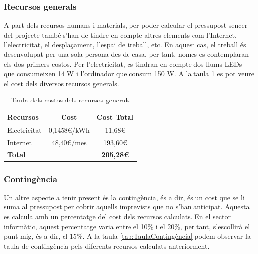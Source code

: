 \documentclass[a4paper]{article}
\begin{document}
\subsubsection{Recursos generals}
A part dels recursos humans i materials, per poder calcular el pressupost sencer del projecte també s'han de tindre en compte altres elements com l'Internet, l'electricitat, el desplaçament, l'espai de treball, etc. En aquest cas, el treball és desenvolupat per una sola persona des de casa, per tant, només es contemplaran els dos primers costos. Per l'electricitat, es tindran en compte dos llums LEDs que consumeixen 14 W i l'ordinador que consum 150 W. A la taula \ref{tab:TaulaCostosGenerals} es pot veure el cost dels diversos recursos generals.

\begin{table}[H]
    \begin{center}
        \begin{tabular}{|l|c|c|}
            \hline
            \rowcolor[HTML]{9B9B9B} 
            {\color[HTML]{000000} \textbf{Recursos}} & {\color[HTML]{000000} \textbf{Cost}} & {\color[HTML]{000000} \textbf{Cost Total}} \\ \hline
            Electricitat                             & 0,1458€/kWh                          & 11,68€                                     \\ \hline
            Internet                                 & 48,40€/mes                           & 193,60€                                    \\ \hline
            \rowcolor[HTML]{C0C0C0} 
            {\color[HTML]{000000} \textbf{Total}}    & {\color[HTML]{000000} \textbf{}}     & {\color[HTML]{000000} \textbf{205,28€}}    \\ \hline
        \end{tabular}
        \caption{Taula dels costos dels recursos generals}
        \label{tab:TaulaCostosGenerals}
    \end{center}
\end{table}

\subsubsection{Contingència}
Un altre aspecte a tenir present és la contingència, és a dir, és un cost que se li suma al pressupost per cobrir aquells imprevists que no s'han anticipat. Aquesta es calcula amb un percentatge del cost dels recursos calculats. En el sector informàtic, aquest percentatge varia entre el 10\% i el 20\%, per tant, s'escollirà el punt mig, és a dir, el 15\%. A la taula \ref{tab:TaulaContingència} podem observar la taula de contingència pels diferents recursos calculats anteriorment.
\end{document}
